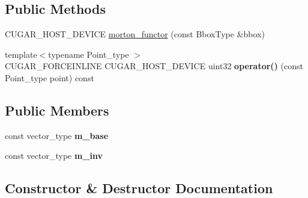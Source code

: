 \subsection*{Public Methods}
\begin{DoxyCompactItemize}
\item 
C\+U\+G\+A\+R\+\_\+\+H\+O\+S\+T\+\_\+\+D\+E\+V\+I\+CE \hyperlink{structcugar_1_1morton__functor_3_01uint32_00_013u_00_01_bbox_type_01_4_ab4f903dd2756ab775a91c70ff31c0627}{morton\+\_\+functor} (const Bbox\+Type \&bbox)
\item 
\mbox{\label{structcugar_1_1morton__functor_3_01uint32_00_013u_00_01_bbox_type_01_4_a5e2e6fa21d338e0504a6f7b7a9531913}} 
{\footnotesize template$<$typename Point\+\_\+type $>$ }\\C\+U\+G\+A\+R\+\_\+\+F\+O\+R\+C\+E\+I\+N\+L\+I\+NE C\+U\+G\+A\+R\+\_\+\+H\+O\+S\+T\+\_\+\+D\+E\+V\+I\+CE uint32 {\bfseries operator()} (const Point\+\_\+type point) const
\end{DoxyCompactItemize}
\subsection*{Public Members}
\begin{DoxyCompactItemize}
\item 
\mbox{\label{structcugar_1_1morton__functor_3_01uint32_00_013u_00_01_bbox_type_01_4_adbb97e98b3e7e7328662e4cb05ca3f4e}} 
const vector\+\_\+type {\bfseries m\+\_\+base}
\item 
\mbox{\label{structcugar_1_1morton__functor_3_01uint32_00_013u_00_01_bbox_type_01_4_a8ae0aec2c03b67dc1ca7e16cef4ed506}} 
const vector\+\_\+type {\bfseries m\+\_\+inv}
\end{DoxyCompactItemize}


\subsection{Constructor \& Destructor Documentation}
\mbox{\label{structcugar_1_1morton__functor_3_01uint32_00_013u_00_01_bbox_type_01_4_ab4f903dd2756ab775a91c70ff31c0627}} 
